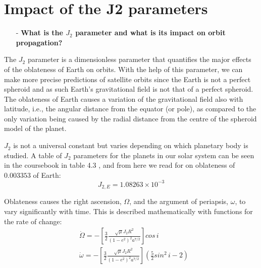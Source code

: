 \section{Impact of the J2 parameters}
\label{sec:J2}

\begin{itemize}
    \item[-] \textbf{What is the $J_2$ parameter and what is its impact on orbit propagation?}
\end{itemize}

The $J_2$ parameter is a dimensionless parameter that quantifies the major effects of the oblateness of Earth on orbits.
With the help of this parameter, we can make more precise predictions of satellite orbits since the Earth is not a perfect spheroid and as such Earth's gravitational field is not that of a perfect spheroid. 
The oblateness of Earth causes a variation of the gravitational field also with latitude, i.e., the angular distance from the equator (or pole), as compared to the only variation being caused by the radial distance from the centre of the spheroid model of the planet. \cite{coursebook_ch4}

$J_2$ is not a universal constant but varies depending on which planetary body is studied. 
A table of $J_2$ parameters for the planets in our solar system can be seen in the coursebook in table 4.3 \cite{coursebook_ch4}, and from here we read for on oblateness of $0.003353$ of Earth: 
\begin{equation}
    J_{2, E} = 1.08263 \times 10^{-3}
\end{equation}

Oblateness causes the right ascension, $\Omega$, and the argument of periapsis, $\omega$, to vary significantly with time. 
This is described mathematically with functions for the rate of change:
\begin{equation}
    \begin{split}
        &\Dot{\Omega} = - \left[ 
            \frac{3} {2} 
            \frac{\sqrt{\mu} J_2 R^2} {(1-e^2)^2 a^{7/2}}
            \right]
            cos \, i\\
        &\Dot{\omega} = - \left[ 
            \frac{3} {2} 
            \frac{\sqrt{\mu} J_2 R^2} {(1-e^2)^2 a^{7/2}}
        \right] 
        \left(
            \frac{5}{2} sin^2 \, i - 2
        \right)
    \end{split}
\end{equation}

